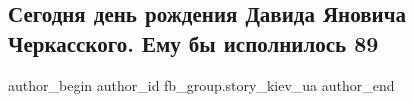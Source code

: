  
 
 
 
 
 
\subsection{Сегодня день рождения Давида Яновича Черкасского. Ему бы исполнилось 89}
\label{sec:23_08_2021.fb.fb_group.story_kiev_ua.1.david_cherkasskij_birthday}
 
\ifcmt
 author_begin
   author_id fb_group.story_kiev_ua
 author_end
\fi
